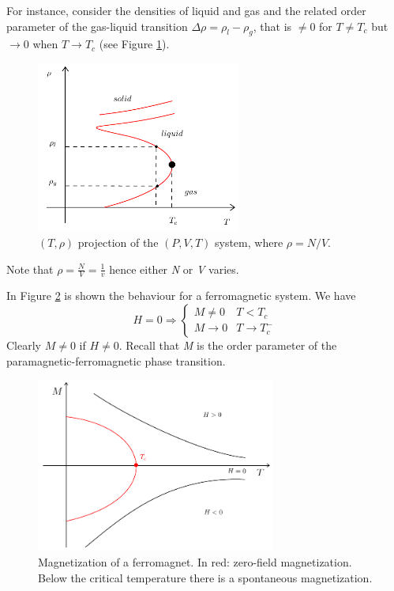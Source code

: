 \documentclass[../../Main/Main.tex]{subfiles}
\begin{document}
For instance, consider the densities of liquid and gas and the related order parameter of the gas-liquid transition \( \Delta \rho = \rho _{l} - \rho _{g} \), that is \( \neq 0 \) for \( T \neq T_c \) but \( \rightarrow 0 \) when \( T \rightarrow T_c \) (see Figure \ref{fig:3_2}).

\begin{figure}[h!]
\centering
\includegraphics[width=0.6\textwidth]{./img/3__2.pdf}
\caption{\label{fig:3_2} \( (T,\rho ) \) projection of the \( (P,V,T) \) system, where \( \rho = N/V \). }
\end{figure}

\begin{remark}
Note that \( \rho = \frac{N}{V} = \frac{1}{v} \) hence either \emph{N} or \emph{V} varies.
\end{remark}


In Figure \ref{fig:3_3} is shown the behaviour for a ferromagnetic system. We have 
\begin{equation*}
  H= 0 \Rightarrow \begin{cases}
    M \neq 0 & T < T_c   \\
    M \rightarrow 0 & T \rightarrow T_c^-
\end{cases}
\end{equation*}
Clearly \( M \neq 0 \) if \( H \neq 0 \). Recall that \emph{M} is the order parameter of the paramagnetic-ferromagnetic phase transition. 
\begin{figure}[h!]
\centering
\includegraphics[width=0.7\textwidth]{./img/5__2.pdf}
\caption{\label{fig:3_3} Magnetization of a ferromagnet. In red: zero-field magnetization. Below the critical temperature there is a spontaneous magnetization.}
\end{figure}
\end{document}

